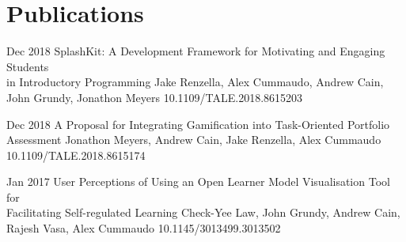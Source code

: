 \section{Publications}

  {Dec 2018}
  {SplashKit: A Development Framework for Motivating and Engaging Students\\in Introductory Programming
  }
  {Jake Renzella, Alex Cummaudo, Andrew Cain, John Grundy, Jonathon Meyers}
  {10.1109/TALE.2018.8615203}

\newpage

  {Dec 2018}
  {A Proposal for Integrating Gamification into Task-Oriented Portfolio Assessment
  }
  {Jonathon Meyers, Andrew Cain, Jake Renzella, Alex Cummaudo}
  {10.1109/TALE.2018.8615174}
  
  {Jan 2017}
  {User Perceptions of Using an Open Learner Model Visualisation Tool for\\Facilitating Self-regulated Learning
  }
  {Check-Yee Law, John Grundy, Andrew Cain, Rajesh Vasa, Alex Cummaudo}
  {10.1145/3013499.3013502}